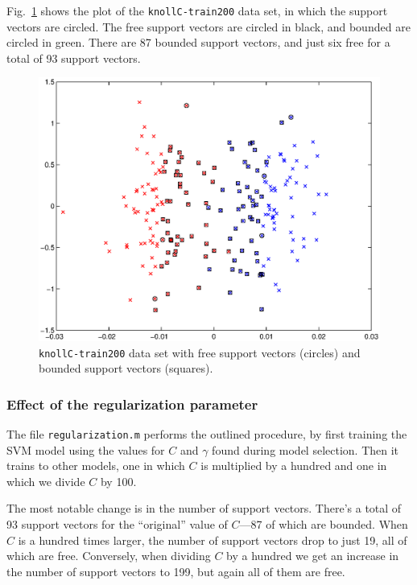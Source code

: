\documentclass{article}
\begin{document}
Fig.~\ref{fig:freebounded} shows the plot of the \texttt{knollC-train200} data set, in which the support vectors are circled. The free support vectors are circled in black, and bounded are circled in green. There are 87 bounded support vectors, and just six free for a total of 93 support vectors.

\begin{figure}[!ht]
  \centering
  \includegraphics[width=.8\textwidth]{Code/freeBoundedSVs.eps}
  \caption{\texttt{knollC-train200} data set with free support vectors (circles) and bounded support vectors (squares).}
  \label{fig:freebounded}
\end{figure}

\subsubsection{Effect of the regularization parameter}


The file \texttt{regularization.m} performs the outlined procedure, by first training the SVM model using the values for $C$ and $\gamma$ found during model selection. Then it trains to other models, one in which $C$ is multiplied by a hundred and one in which we divide $C$ by 100.

The most notable change is in the number of support vectors. There's a total of 93 support vectors for the ``original'' value of $C$---87 of which are bounded. When $C$ is a hundred times larger, the number of support vectors drop to just 19, all of which are free. Conversely, when dividing $C$ by a hundred we get an increase in the number of support vectors to 199, but again all of them are free.
\end{document}
